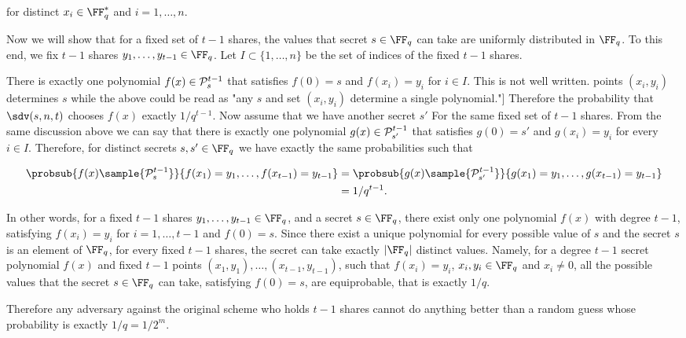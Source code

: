 \documentclass[envcountsame,runningheads,notitlepage]{llncs}
\DeclareRobustCommand{\michals}[2] {{\color{magenta}{$\big[$\scriptsize\textsf{Michal #1:}} #2$\big]$}}
\begin{document}
	for distinct $x_i \in \FF_q^*$ and $i = 1, \ldots, n$.
	
	Now we will show that for a fixed set of $t-1$ shares, the values that secret $s \in \FF_q$ can take are uniformly distributed in $\FF_q$. 
	To this end, we fix $t-1$ shares $y_1, \ldots, y_{t-1} \in \FF_q$. Let  $I \subset \{1, \ldots, n\}$ be the set of indices of the fixed $t-1$ shares. 
	
	There is exactly one polynomial $f(x) \in {\mathcal P}_{s}^{t - 1}$ that satisfies $f(0) = s$ and $f(x_{i}) = y_{i}$ for $i \in I$. \michals{29.03}{This is not well written. points $(x_i, y_i)$ determines $s$ while the above could be read as "any $s$ and set $(x_i, y_i)$ determine a single polynomial."}
	Therefore the probability that $\sdv(s, n, t)$ chooses $f(x)$ exactly $1/q^{t-1}$.
	Now assume that we have another secret $s'$ For the same fixed set of $t-1$ shares.  
	From the same discussion above we can say that there is exactly one polynomial $g(x) \in {\mathcal P}_{s'}^{t - 1}$ that satisfies $g(0) = s'$ and $g(x_{i}) = y_{i}$ for every $i \in I$.
	Therefore, for distinct secrets $s,s' \in \FF_q$ we have exactly the same probabilities such that
	
	\begin{align*}
		\probsub{f(x) \sample {\sP_{s}^{t - 1}}}{f(x_1) = y_1, \ldots, f(x_{t-1}) = y_{t-1}} &= \probsub{g(x) \sample {\sP_{s'}^{t - 1}}}{g(x_1) = y_1, \ldots, g(x_{t-1}) = y_{t-1}} \\
		&= 1/q^{t-1}.
	\end{align*}
	
	In other words, for a fixed $t-1$ shares $y_1, \ldots, y_{t-1} \in \FF_q$, and a secret $s \in \FF_q$, there exist only one polynomial $f(x)$ with degree $t-1$, satisfying $f(x_i) = y_i$ for $i = 1, \ldots, t-1$ and $f(0) = s$.
	Since there exist a unique polynomial for every possible value of $s$ and the secret $s$ is an element of $\FF_q$, for every fixed $t-1$ shares, the secret can take exactly $|\FF_q|$ distinct values. 
	Namely, for a  degree $t - 1$ secret polynomial $f(x)$ and fixed $t-1$ points $(x_1, y_1), \ldots, (x_{t-1}, y_{t-1})$, such that $f(x_i) = y_i$, $x_i, y_i \in \FF_q$ and $x_i \neq 0$, all the possible values that the secret $s \in \FF_q$ can take, satisfying $f(0) = s$, are equiprobable, that is exactly $1/q$.  
 
	Therefore any adversary against the original scheme who holds $t-1$ shares cannot do anything better than a random guess whose probability is exactly $1/q = 1/2^m$.
\end{document}
